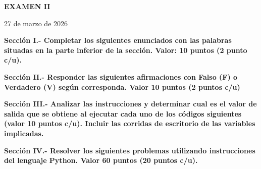 \documentclass[10pt,addpoints]{exam}
\begin{document}
\begin{center}
  \sffamily\textbf{EXAMEN II}
\end{center}
\begin{flushright}
27 de marzo de 2026
\end{flushright}

\begin{questions}
\begin{EnvFullwidth}
  \sffamily\textbf{Sección I.- Completar los siguientes enunciados con las
  palabras situadas en la parte inferior de la sección. Valor: 10 puntos
  (2 punto c/u).}
\end{EnvFullwidth}








\end{questions}

\begin{questions}
\begin{EnvFullwidth}
  \sffamily\textbf{Sección II.- Responder las siguientes afirmaciones con
  Falso (F) o Verdadero (V) según corres\-ponda. Valor 10 puntos (2 puntos c/u)}
\end{EnvFullwidth}







\end{questions}


\begin{questions}
\begin{EnvFullwidth}
  \sffamily\textbf{Sección III.- Analizar las instrucciones y determinar
  cual es el valor de salida que se obtiene al ejecutar cada uno de los
  códigos siguientes (valor 10 puntos c/u). Incluir las corridas de
  escritorio de las variables implicadas.
  }
\end{EnvFullwidth}



%

\end{questions}

\begin{questions}
\begin{EnvFullwidth}
  \sffamily\textbf{Sección IV.- Resolver los siguientes problemas utilizando
  instrucciones del lenguaje Python. Valor 60 puntos (20 puntos c/u).}
\end{EnvFullwidth}





\end{questions}
\end{document}
